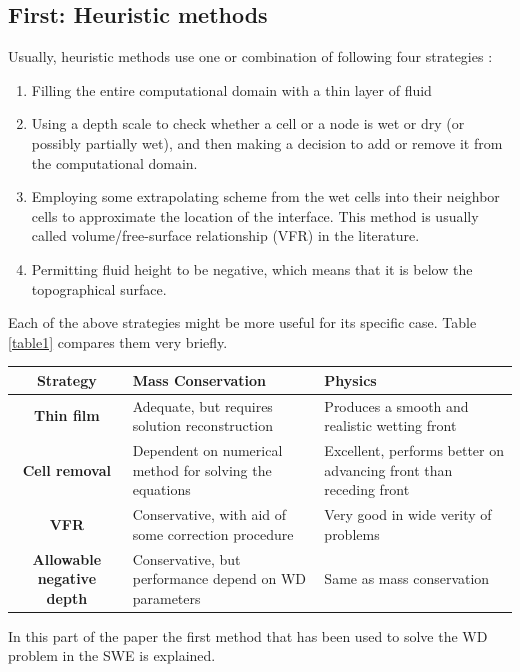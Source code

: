 \documentclass[letterpaper,10pt]{article}
\begin{document}
\subsection{First: Heuristic methods} \label{Heuristic}
Usually, heuristic methods use one or combination of following four strategies \cite{Medeiros2013}: 
\begin{enumerate}
 
 \item Filling the entire computational domain with a thin layer of fluid
 \item Using a depth scale to check whether a cell or a node is wet or dry 
 (or possibly partially wet), and then  making a decision to add or remove it 
 from the computational domain.
 \item Employing some extrapolating scheme from the wet cells into their neighbor 
 cells to approximate the location of the interface. This method is usually called 
 volume/free-surface relationship (VFR) in the literature.
 \item Permitting fluid height to be negative, which means that it is below the topographical surface.
\end{enumerate}
Each of the above strategies might be more useful for its specific case. Table \ref{table1} compares them very briefly.

\begin{center}\label{table1}
	\begin{tabular}{|c|p{5cm}|p{5cm}|}
		\hline
		{\bf Strategy}                  & {\bf Mass Conservation}                                          & {\bf Physics} \\
		\hline
		{\bf Thin film}                 & Adequate, but requires solution reconstruction 
		& Produces a smooth and realistic wetting front     \\
		\hline 
		{\bf Cell removal}              & Dependent on numerical method for solving the equations          & Excellent, performs better on advancing front than receding front \\
		\hline
		{\bf VFR}                       & Conservative, with aid of some correction procedure              & Very good in wide verity of problems      \\
		\hline
		{\bf Allowable negative depth}  & Conservative, but performance depend on WD parameters            & Same as mass conservation      \\
		\hline
	\end{tabular}
\end{center}
In this part of the paper the first method that has been used to solve the WD problem in the SWE is explained.
\end{document}
